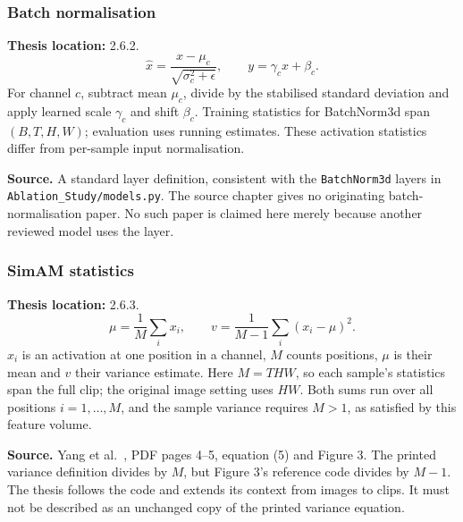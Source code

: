\documentclass[11pt,a4paper]{article}
\numberwithin{equation}{section}
\begin{document}
\subsubsection{Batch normalisation}
\label{fg:bn}
\textbf{Thesis location:} 2.6.2.
\begin{equation}
    \widehat x=\frac{x-\mu_c}{\sqrt{\sigma_c^2+\epsilon}},
    \qquad y=\gamma_c\widehat x+\beta_c.
    \label{fg:eq:bn}
\end{equation}
For channel $c$, subtract mean $\mu_c$, divide by the stabilised standard
deviation and apply learned scale $\gamma_c$ and shift $\beta_c$. Training
statistics for BatchNorm3d span $(B,T,H,W)$; evaluation uses running estimates.
These activation statistics differ from per-sample input normalisation.

\textbf{Source.} A standard layer definition, consistent with the
\texttt{BatchNorm3d} layers in \texttt{Ablation\_Study/models.py}.
The source chapter gives no originating batch-normalisation paper. No such
paper is claimed here merely because another reviewed model uses the layer.

\subsubsection{SimAM statistics}
\label{fg:simamstats}
\textbf{Thesis location:} 2.6.3.
\begin{equation}
    \mu=\frac1M\sum_i x_i,\qquad
    v=\frac1{M-1}\sum_i(x_i-\mu)^2.
    \label{fg:eq:simamstats}
\end{equation}
$x_i$ is an activation at one position in a channel, $M$ counts positions,
$\mu$ is their mean and $v$ their variance estimate. Here $M=THW$, so each
sample's statistics span the full clip; the original image setting uses $HW$.
Both sums run over all positions $i=1,\ldots,M$, and the sample variance
requires $M>1$, as satisfied by this feature volume.

\textbf{Source.} Yang et al.~\cite{yang2021}, PDF pages 4--5,
equation (5) and Figure 3. The printed variance definition divides by $M$,
but Figure 3's reference code divides by $M-1$. The thesis follows the code
and extends its context from images to clips. It must not be described as
an unchanged copy of the printed variance equation.
\end{document}
